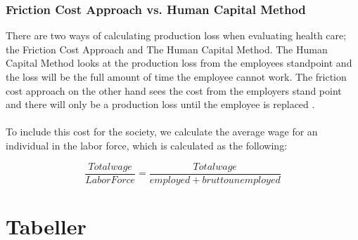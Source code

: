 \documentclass[a4paper,12pt]{article}
\begin{document}
\subsubsection*{Friction Cost Approach vs.  Human Capital Method }
There are two ways of calculating production loss when evaluating health care; the Friction Cost Approach and The Human Capital Method. The Human Capital Method looks at the production loss from the employees standpoint and the loss will be the full amount of time the employee cannot work. The friction cost approach on the other hand sees the cost from the employers stand point and there will only be a production loss until the employee is replaced \cite{friktion}. 
\\\\
To include this cost for the society, we calculate the average wage for an individual in the labor force, which is calculated as the following: 

\begin{equation}
\dfrac{Total wage}{Labor Force} = \dfrac{Total wage}{employed + brutto unemployed} 
\end{equation}





\section{Tabeller}
\end{document}
